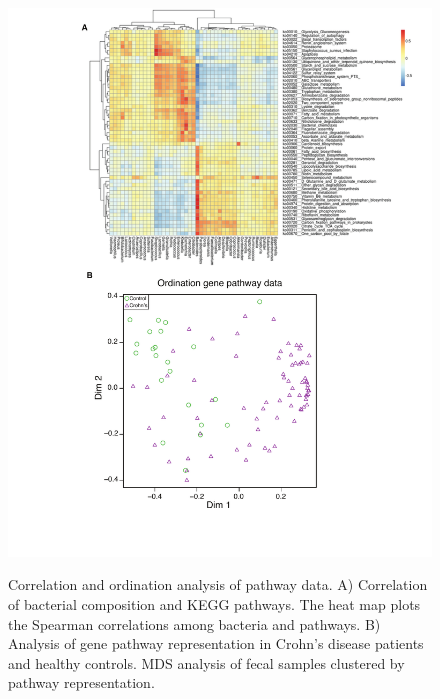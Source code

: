 \begin{figure}[p]
	\centering
	{\includegraphics[scale=0.7,trim=0 40 0 0,clip]{Figure/F2S2_gene_heatmap.pdf}}
	\caption[Correlation of bacterial composition and KEGG pathways]{Correlation and ordination analysis of pathway data. A) Correlation of bacterial composition and KEGG pathways. The heat map plots the Spearman correlations among bacteria and pathways. B) Analysis of gene pathway representation in Crohn’s disease patients and healthy controls. MDS analysis of fecal samples clustered by pathway representation. 
	}
	\label{F2S2_gene_heatmap}
\end{figure}




